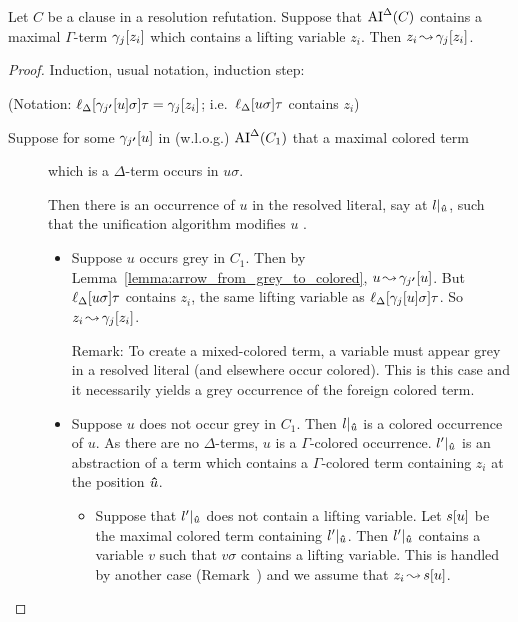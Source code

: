 \documentclass[,%
	paper=a4,%
	DIV9, %
	twoside=false,%
	liststotoc,
	bibtotoc,
	draft=false,%
	numbers=noendperiod
]{scrartcl}
\begin{document}
\begin{conj}
	Let $C$ be a clause in a resolution refutation. 
	Suppose that $\operatorname{AI}^\Delta(C)$ contains a maximal $\Gamma$-term $\gamma_j[z_i]$ which contains a lifting variable $z_i$.
	Then $z_i \operatorname{\leadsto} \gamma_j[z_i]$.
\end{conj}
\begin{proof}
	Induction, usual notation, induction step:

	(Notation: $\ell_{\Delta}[\gamma_{j\bm '}[u]\sigma]\tau = \gamma_j[z_i]$; i.e.\ $\ell_{\Delta}[u\sigma]\tau$ contains $z_i$)

	\begin{description}
		\item[Suppose for some $\gamma_{j\bm '}[u]$ in (w.l.o.g.) $\operatorname{AI}^\Delta(C_1)$ that a maximal colored term] which is a $\Delta$-term occurs in $u\sigma$.


			Then there is an occurrence of $u$ in the resolved literal, say at $l|_{\bm\hat u}$, such that the unification algorithm modifies $u$ .


			\begin{itemize}
				\item
					Suppose $u$ occurs grey in $C_1$.
					Then by Lemma~\ref{lemma:arrow_from_grey_to_colored}, $u\operatorname{\leadsto} \gamma_{j\bm '}[u]$.
					But $\ell_{\Delta}[u\sigma]\tau$ contains $z_i$,
					the same lifting variable as $\ell_{\Delta}[\gamma_j[u]\sigma]\tau$.
					So $z_i\operatorname{\leadsto} \gamma_j[z_i]$.

					Remark:
					To create a mixed-colored term, a variable must appear grey in a resolved literal (and elsewhere occur colored).
					This is this case and it necessarily yields a grey occurrence of the foreign colored term.

				\item
					Suppose $u$ does not occur grey in $C_1$.
					Then $l|_{\bm\hat{u}}$ is a colored occurrence of $u$. As there are no $\Delta$-terms, $u$ is a $\Gamma$-colored occurrence. 
					$l'|_{\bm\hat u}$ is an abstraction of a term which contains a $\Gamma$-colored term containing $z_i$ at the position $\bm\hat u$. 

					\begin{itemize}
						\item Suppose that $l'|_{\bm\hat u}$ does not contain a lifting variable. Let $s[u]$ be the maximal colored term containing $l'|_{\bm\hat u}$.
							Then $l'|_{\bm\hat u}$ contains a variable $v$ such that $v\sigma$ contains a lifting variable.
							This is handled by another case (Remark~\substremarkref) and we assume that $z_i\operatorname{\leadsto} s[u]$.


\end{itemize}
\end{itemize}
\end{description}
\end{proof}
\end{document}
